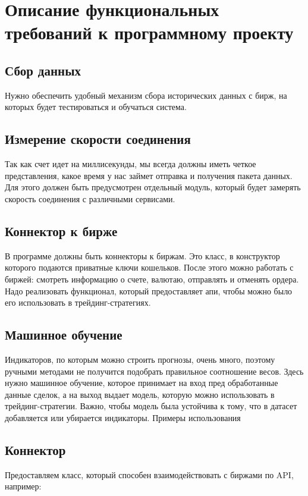 \section{Описание функциональных требований к программному проекту}

\subsection{Сбор данных}
Нужно обеспечить удобный механизм сбора исторических данных с бирж, на которых будет тестироваться и обучаться система.

\subsection{Измерение скорости соединения}
Так как счет идет на миллисекунды, мы всегда должны иметь четкое представления, какое время у нас займет отправка и получения пакета данных. Для этого должен быть предусмотрен отдельный модуль, который будет замерять скорость соединения с различными сервисами.

\subsection{Коннектор к бирже}
В программе должны быть коннекторы к биржам. Это класс, в конструктор которого подаются приватные ключи кошельков. После этого можно работать с биржей: смотреть информацию о счете, валютаю, отправлять и отменять ордера. Надо реализовать функционал, который предоставляет апи, чтобы можно было его использовать в трейдинг-стратегиях.

\subsection{Машинное обучение}
Индикаторов, по которым можно строить прогнозы, очень много, поэтому ручными методами не получится подобрать правильное соотношение весов. Здесь нужно машинное обучение, которое принимает на вход пред обработанные данные сделок, а на выход выдает модель, которую можно использовать в трейдинг-стратегии. Важно, чтобы модель была устойчива к тому, что в датасет добавляется или убирается индикаторы.
Примеры использования

\subsection{Коннектор}
Предоставляем класс, который способен взаимодействовать с биржами по API, например:

